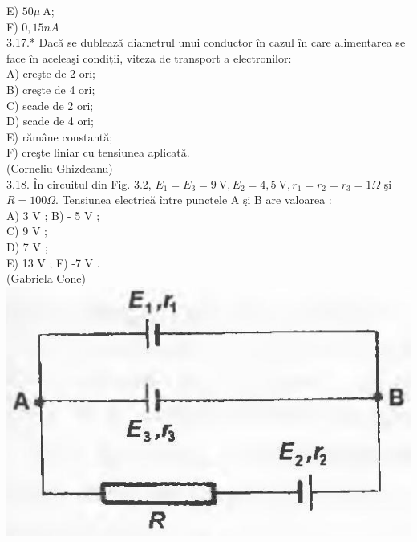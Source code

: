 \documentclass[10pt]{article}
\begin{document}
E) $50 \mu \mathrm{~A}$;\\
F) $0,15 n A$\\
3.17.* Dacă se dublează diametrul unui conductor în cazul în care alimentarea se face în aceleaşi condiții, viteza de transport a electronilor:\\
A) creşte de 2 ori;\\
B) creşte de 4 ori;\\
C) scade de 2 ori;\\
D) scade de 4 ori;\\
E) rămâne constantă;\\
F) creşte liniar cu tensiunea aplicată.\\
(Corneliu Ghizdeanu)\\
3.18. În circuitul din Fig. 3.2, $E_{1}=E_{3}=9 \mathrm{~V}, E_{2}=4,5 \mathrm{~V}, r_{1}=r_{2}=r_{3}=1 \Omega$ şi $R=100 \Omega$. Tensiunea electrică între punctele A şi B are valoarea :\\
A) 3 V ; B) - 5 V ;\\
C) 9 V ;\\
D) 7 V ;\\
E) 13 V ; F) -7 V .\\
(Gabriela Cone)\\
\includegraphics[max width=\textwidth, center]{2025_07_01_5b3ff9fa0d508c8e9f17g-147(1)}
\end{document}
